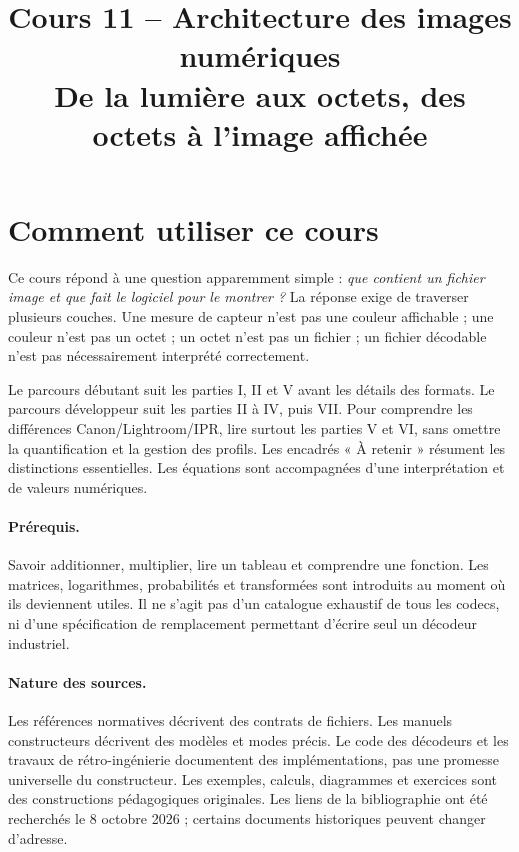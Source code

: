 
\setcounter{tocdepth}{2}
\setlength{\emergencystretch}{2em}
\title{Cours 11 -- Architecture des images numériques\\
\large De la lumière aux octets, des octets à l'image affichée}


\section*{Comment utiliser ce cours}
Ce cours répond à une question apparemment simple : \emph{que contient un
fichier image et que fait le logiciel pour le montrer ?} La réponse exige
de traverser plusieurs couches. Une mesure de capteur n'est pas une couleur
affichable ; une couleur n'est pas un octet ; un octet n'est pas un fichier ;
un fichier décodable n'est pas nécessairement interprété correctement.

Le parcours débutant suit les parties I, II et V avant les détails des
formats. Le parcours développeur suit les parties II à IV, puis VII.
Pour comprendre les différences Canon/Lightroom/IPR, lire surtout les
parties V et VI, sans omettre la quantification et la gestion des profils.
Les encadrés « À retenir » résument les distinctions essentielles.
Les équations sont accompagnées d'une interprétation et de valeurs numériques.

\paragraph{Prérequis.} Savoir additionner, multiplier, lire un tableau et
comprendre une fonction. Les matrices, logarithmes, probabilités et
transformées sont introduits au moment où ils deviennent utiles. Il ne
s'agit pas d'un catalogue exhaustif de tous les codecs, ni d'une
spécification de remplacement permettant d'écrire seul un décodeur industriel.

\paragraph{Nature des sources.} Les références normatives décrivent des
contrats de fichiers. Les manuels constructeurs décrivent des modèles
et modes précis. Le code des décodeurs et les travaux de rétro-ingénierie
documentent des implémentations, pas une promesse universelle du constructeur.
Les exemples, calculs, diagrammes et exercices sont des constructions
pédagogiques originales. Les liens de la bibliographie ont été recherchés
le 8 octobre 2026 ; certains documents historiques peuvent changer d'adresse.

